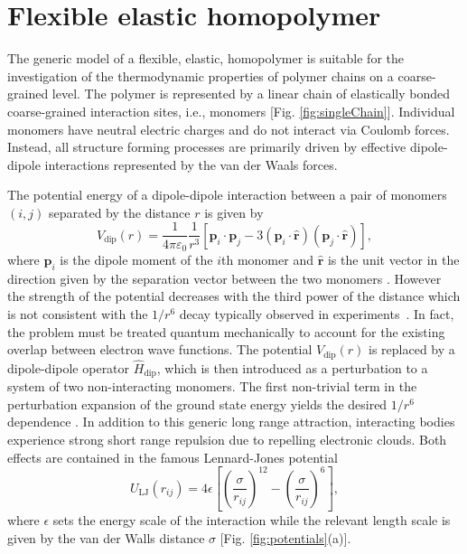 \documentclass[12pt]{report}
\begin{document}
\section{Flexible elastic homopolymer}
The generic model of a flexible, elastic, homopolymer is suitable for the investigation of the thermodynamic properties of polymer chains on a coarse-grained level. The polymer is represented by a linear chain of elastically bonded coarse-grained interaction sites, i.e., monomers [Fig.\,\,\ref{fig:singleChain}]. Individual monomers have neutral electric charges and do not interact via Coulomb forces. Instead, all structure forming processes are primarily driven by effective dipole-dipole interactions represented by the van der Waals forces. 

The potential energy of a dipole-dipole interaction between a pair of monomers $(i,j)$ separated by the distance $r$ is given by 
\begin{equation}
V_{\mathrm{dip}}(r) = \frac{1}{4\pi \varepsilon _{0} }\frac{1}{r^{3}} \left[\mathbf{p}_{i}\cdot \mathbf{p}_{j} - 3\left(\mathbf{p}_{i}\cdot \hat{\mathbf{r}}\right)\left(\mathbf{p}_{j}\cdot \hat{\mathbf{r}}\right)\right],
\end{equation}
where $\mathbf{p}_{i}$ is the dipole moment of the $i$th monomer and $\hat{\mathbf{r}}$ is the unit vector in the direction given by the separation vector between the two monomers \cite{Griffiths1999}. However the strength of the potential decreases with the third power of the distance which is not consistent with the $1/r^{6}$ decay typically observed in experiments~\cite{ExpWaals}. In fact, the problem must be treated quantum mechanically to account for the existing overlap between electron wave functions. The potential $V_{\mathrm{dip}}(r)$ is replaced by a dipole-dipole operator $\hat{H}_{\mathrm{dip}}$, which is then introduced as a perturbation to a system of two non-interacting monomers. The first non-trivial term in the perturbation expansion of the ground state energy yields the desired $1/r^{6}$ dependence \cite{Bachmann2014}. In addition to this generic long range attraction, interacting bodies experience strong short range repulsion due to repelling electronic clouds. Both effects are contained in the famous Lennard-Jones potential \cite{Lennard-Jones1931}
%
\begin{equation}
U_{\mathrm{LJ}}(r_{ij})= 4\epsilon \left[ \left(
\frac{\sigma}{r_{ij}} \right)^{12} - 			\left(
\frac{\sigma}{r_{ij}} \right)^{6} \right], 
\label{eq:LJ1}
\end{equation}
%
where $\epsilon$  sets the energy scale of the interaction while the relevant length scale is given by the van der Walls distance $\sigma$ [Fig.\,\,\ref{fig:potentials}(a)].
 
\end{document}
